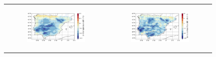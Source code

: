 \begin{figure}[htbp]
\begin{tabular}{cc}
        \begin{subfigure}[b]{0.5\textwidth}
            \caption{}
            \includegraphics[width=\textwidth]{images/chap4/future/diffmap_t2m_futirr.png}
        \end{subfigure} &
        \begin{subfigure}[b]{0.5\textwidth}
            \caption{}
            \includegraphics[width=\textwidth]{images/chap4/future/diffmap_fluxsens_futirr.png}
        \end{subfigure} \\


\end{tabular}
\end{figure}
